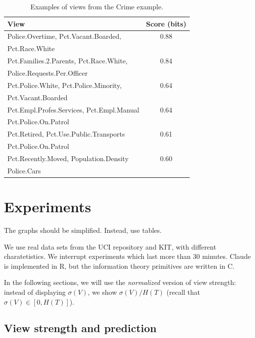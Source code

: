 \begin{table}[position specifier]
  \centering
\begin{tabular}{l c}
    \hline
    View & Score (bits) \\
    \hline
    Police.Overtime, Pct.Vacant.Boarded, & 0.88\\
    Pct.Race.White & \\
    Pct.Families.2.Parents, Pct.Race.White, & 0.84\\
    Police.Requests.Per.Officer & \\
    Pct.Police.White, Pct.Police.Minority, & 0.64\\
    Pct.Vacant.Boarded &\\
    Pct.Empl.Profes.Services, Pct.Empl.Manual & 0.64\\
    Pct.Police.On.Patrol & \\      
    Pct.Retired, Pct.Use.Public.Transports & 0.61 \\
     Pct.Police.On.Patrol & \\ 
    Pct.Recently.Moved, Population.Density & 0.60 \\
    Police.Cars & \\
    \hline
\end{tabular}
\caption{Examples of views from the Crime example.}
  \label{tab:crime_views}
\end{table}

\section{Experiments}

{\color{red}
The graphs should be simplified. Instead, use tables.
}

We use real data sets from the UCI repository and KIT, with different
charatetistics. We interrupt experiments which last more than 30 minutes.
Claude is implemented in R, but the information theory primitives are written
in C.

In the following sections, we will use the \emph{normalized} version of view
strength: instead of displaying $\sigma(V)$, we show $\sigma(V) / H(T)$ (recall
that $\sigma(V) \in [0, H(T) ]$).

\subsection{View strength and prediction}

